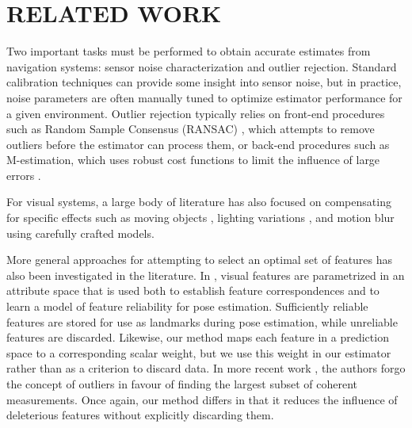 \documentclass[letterpaper, 10 pt, conference]{ieeeconf}  %
\begin{document}
\section{RELATED WORK} \label{sec:related_work}
Two important tasks must be performed to obtain accurate estimates from navigation systems: sensor noise characterization and outlier rejection.
Standard calibration techniques can provide some insight into sensor noise, but in practice, noise parameters are often manually tuned to optimize estimator performance for a given environment.
Outlier rejection typically relies on front-end procedures such as Random Sample Consensus (RANSAC) \cite{Fischler:1981cv, VisualOdometry:n9UHQMsK}, which attempts to remove outliers before the estimator can process them, or back-end procedures such as M-estimation, which uses robust cost functions to limit the influence of large errors \cite{Latif:2014dy}.

For visual systems, a large body of literature has also focused on compensating for specific effects such as moving objects \cite{Wangsiripitak:2009bt}, lighting variations \cite{McManus:2014ew}, and motion blur \cite{Pretto:2009er} using carefully crafted models. %

More general approaches for attempting to select an optimal set of features has also been investigated in the literature. In \cite{Sim:1999ksa}, visual features are parametrized in an attribute space that is used both to establish feature correspondences and to learn a model of feature reliability for pose estimation. Sufficiently reliable features are stored for use as landmarks during pose estimation, while unreliable features are discarded. Likewise, our method maps each feature in a prediction space to a corresponding scalar weight, but we use this weight in our estimator rather than as a criterion to discard data. In more recent work \cite{Carlone:2014dt}, the authors forgo the concept of outliers in favour of finding the largest subset of coherent measurements.  Once again, our method differs in that it reduces the influence of deleterious features without explicitly discarding them.
\end{document}
